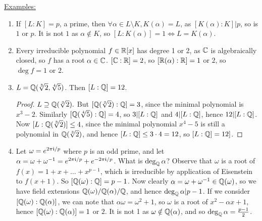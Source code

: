 \documentclass[10pt,a4paper]{article}
\begin{document}
\underline{Examples:}
\begin{enumerate}
\item If $[L:K] = p$, a prime, then $\forall \alpha \in L\setminus K, K(\alpha) = L$, as $[K(\alpha) : K]|p$, so is $1$ or $p$. It is not $1$ as $\alpha \notin K$, so $[L:K(\alpha)] = 1 \iff L = K(\alpha)$.
\item Every irreducible polynomial  $f \in \mathbb{R}[x]$ has degree 1 or 2, as $\mathbb{C}$ is algebraically closed, so $f$ has a root $\alpha \in \mathbb{C}$. $[\mathbb{C}:\mathbb{R}] = 2$, so $[\mathbb{R}(\alpha):\mathbb{R}] = 1$ or $2$, so $\deg f = 1$ or $2$.
\item $L = \mathbb{Q}(\sqrt[3]{2},\sqrt[4]{5})$. Then $[L:\mathbb{Q}] = 12$.
\begin{proof}
$L \supseteq \mathbb{Q}(\sqrt[3]{2}).$ But $[\mathbb{Q}(\sqrt[3]{2}):\mathbb{Q}] = 3$, since the minimal polynomial is $x^3-2$. Similarly $[\mathbb{Q}(\sqrt[4]{5}):\mathbb{Q}] = 4$, so $3|[L:\mathbb{Q}]$ and $4|[L:\mathbb{Q}]$, hence $12|[L:\mathbb{Q}]$. Now $[L:\mathbb{Q}(\sqrt[3]{2})] \leq 4$, since the minimal polynomial $x^4-5$ is still a polynomial in $\mathbb{Q}(\sqrt[3]{2})$, and hence $[L:\mathbb{Q}] \leq 3\cdot 4 = 12$, so $[L:\mathbb{Q}] = 12]$.
\end{proof}
\item Let $\omega = e^{2\pi\mathfrak{i}/p}$ where $p$ is an odd prime, and let $\alpha =\omega + \omega^{-1} = e^{2\pi\mathfrak{i}/p} + e^{-2\pi\mathfrak{i}/p}$. What is $\deg_{\mathbb{Q}} \alpha$? Observe that $\omega$ is a root of $f(x)=1+x+\ldots+x^{p-1}$, which is irreducible by application of Eisenstein to $f(x+1)$. So $[\mathbb{Q}(\omega):\mathbb{Q}] = p-1$. Now clearly $\alpha = \omega + \omega^{-1} \in \mathbb{Q}(\omega)$, so we have field extensions $\mathbb{Q}(\omega)/\mathbb{Q}(\alpha)/\mathbb{Q}$, and hence $\deg_{\mathbb{Q}} \alpha|p-1$. If we consider $[\mathbb{Q}(\omega):\mathbb{Q}(\alpha)]$, we can note that $\alpha\omega = \omega^2 + 1$, so $\omega$ is a root of $x^2-\alpha x+1$, hence $[\mathbb{Q}(\omega):\mathbb{Q}(\alpha)] = 1$ or $2$. It is not 1 as $\omega \notin \mathbb{Q}(\alpha)$, and so $\deg_{\mathbb{Q}} \alpha = \frac{p-1}{2}$.
\end{enumerate}
\end{document}
